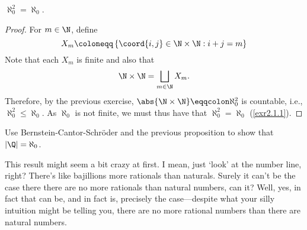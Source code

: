 \begin{prp}{}{}
$\aleph _0^2=\aleph _0$.
\begin{proof}
For $m\in \N$, define
\begin{equation}
X_m\coloneqq \left\{ \coord{i,j}\in \N \times \N:i+j=m\right\} 
\end{equation}
Note that each $X_m$ is finite and also that
\begin{equation}
\N \times \N =\bigsqcup _{m\in \N}X_m.
\end{equation}
Therefore, by the previous exercise, $\abs{\N \times \N }\eqqcolon \aleph _0^2$ is countable, i.e., $\aleph _0^2\leq \aleph _0$.  As $\aleph _0$ is not finite, we must thus have that $\aleph _0^2=\aleph _0$ (\cref{exr2.1.1}).
\end{proof}
\end{prp}
\begin{exr}{}{}
Use Bernstein-Cantor-Schr\"{o}der and the previous proposition to show that $|\Q |=\aleph _0$.
\end{exr}
This result might seem a bit crazy at first.  I mean, just `look' at the number line, right?  There's like bajillions more rationals than naturals.  Surely it can't be the case there there are no more rationals than natural numbers, can it?  Well, yes, in fact that can be, and in fact is, precisely the case---despite what your silly intuition might be telling you, there are no more rational numbers than there are natural numbers.

